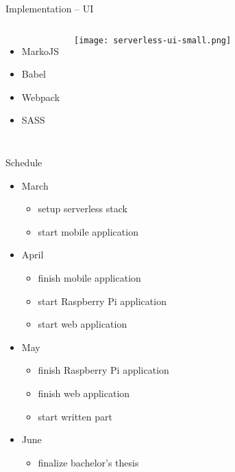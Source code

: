 \documentclass[aspectratio=169]{beamer}
\begin{document}
  

  \begin{frame}{Implementation -- UI}
    \begin{columns}
        \begin{itemize}
          \item MarkoJS
          \item Babel
          \item Webpack
          \item SASS
        \end{itemize}
        \vfill
        \centering
        \texttt{[image: serverless-ui-small.png]}
     \end{columns}
  \end{frame}

  \begin{frame}{Schedule}
    \begin{itemize}
      \item March
        \begin{itemize}
          \item setup serverless stack
          \item start mobile application
        \end{itemize}
      \item April
        \begin{itemize}
          \item finish mobile application
          \item start Raspberry Pi application
          \item start web application
        \end{itemize}
      \item May
        \begin{itemize}
          \item finish Raspberry Pi application
          \item finish web application
          \item start written part
        \end{itemize}
      \item June
        \begin{itemize}
          \item finalize bachelor’s thesis
        \end{itemize}
    \end{itemize}
  \end{frame}
\end{document}
